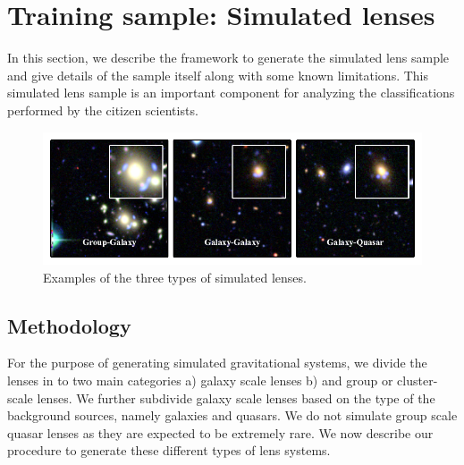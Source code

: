 \documentclass[useAMS,usenatbib,a4paper]{mn2e}
\begin{document}


\section{Training sample: Simulated lenses}
\label{sec:ts}

In this section, we describe the framework to generate the simulated lens sample
and give details of the sample itself along with some known limitations. This
simulated lens sample is an important component for analyzing the
classifications performed by the citizen scientists.

\begin{figure}
\begin{center}
\includegraphics[scale=1.0]{sw-cfhtls-figs/sim_cgq.pdf}
\caption{ \label{fig:sim}
Examples of the three types of simulated lenses.
}
\end{center}
\end{figure}


\subsection{Methodology}
\label{sec:simmethod}

For the purpose of generating simulated gravitational systems, we divide the
lenses in to two main categories a) galaxy scale lenses b) and group or
cluster-scale lenses. We further subdivide galaxy scale lenses based on the
type of the background sources, namely galaxies and quasars. We do not simulate
group scale quasar lenses as they are expected to be extremely rare. We now
describe our procedure to generate these different types of lens systems.
\end{document}
